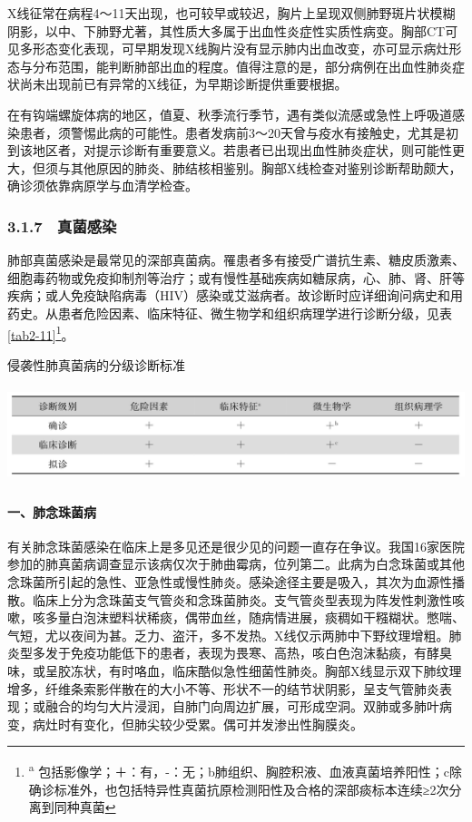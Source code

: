 X线征常在病程4～11天出现，也可较早或较迟，胸片上呈现双侧肺野斑片状模糊阴影，以中、下肺野尤著，其性质大多属于出血性炎症性实质性病变。胸部CT可见多形态变化表现，可早期发现X线胸片没有显示肺内出血改变，亦可显示病灶形态与分布范围，能判断肺部出血的程度。值得注意的是，部分病例在出血性肺炎症状尚未出现前已有异常的X线征，为早期诊断提供重要根据。

在有钩端螺旋体病的地区，值夏、秋季流行季节，遇有类似流感或急性上呼吸道感染患者，须警惕此病的可能性。患者发病前3～20天曾与疫水有接触史，尤其是初到该地区者，对提示诊断有重要意义。若患者已出现出血性肺炎症状，则可能性更大，但须与其他原因的肺炎、肺结核相鉴别。胸部X线检查对鉴别诊断帮助颇大，确诊须依靠病原学与血清学检查。

\subsubsection{3.1.7　真菌感染}

肺部真菌感染是最常见的深部真菌病。罹患者多有接受广谱抗生素、糖皮质激素、细胞毒药物或免疫抑制剂等治疗；或有慢性基础疾病如糖尿病，心、肺、肾、肝等疾病；或人免疫缺陷病毒（HIV）感染或艾滋病者。故诊断时应详细询问病史和用药史。从患者危险因素、临床特征、微生物学和组织病理学进行诊断分级，见表\ref{tab2-11}\footnote{\textsuperscript{a}
包括影像学；＋：有，-：无；b肺组织、胸腔积液、血液真菌培养阳性；c除确诊标准外，也包括特异性真菌抗原检测阳性及合格的深部痰标本连续≥2次分离到同种真菌}。

\begin{table}[htbp]
\centering
\caption{侵袭性肺真菌病的分级诊断标准}
\label{tab2-11}
\includegraphics[width=5.94792in,height=1.08333in]{./images/Image00016.jpg}
\end{table}



\paragraph{一、肺念珠菌病}

有关肺念珠菌感染在临床上是多见还是很少见的问题一直存在争议。我国16家医院参加的肺真菌病调查显示该病仅次于肺曲霉病，位列第二。此病为白念珠菌或其他念珠菌所引起的急性、亚急性或慢性肺炎。感染途径主要是吸入，其次为血源性播散。临床上分为念珠菌支气管炎和念珠菌肺炎。支气管炎型表现为阵发性刺激性咳嗽，咳多量白泡沫塑料状稀痰，偶带血丝，随病情进展，痰稠如干糨糊状。憋喘、气短，尤以夜间为甚。乏力、盗汗，多不发热。X线仅示两肺中下野纹理增粗。肺炎型多发于免疫功能低下的患者，表现为畏寒、高热，咳白色泡沫黏痰，有酵臭味，或呈胶冻状，有时咯血，临床酷似急性细菌性肺炎。胸部X线显示双下肺纹理增多，纤维条索影伴散在的大小不等、形状不一的结节状阴影，呈支气管肺炎表现；或融合的均匀大片浸润，自肺门向周边扩展，可形成空洞。双肺或多肺叶病变，病灶时有变化，但肺尖较少受累。偶可并发渗出性胸膜炎。

